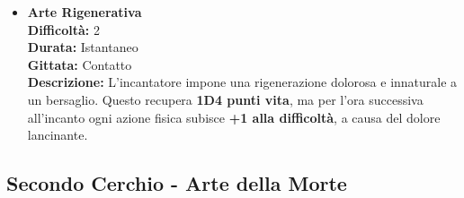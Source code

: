 \documentclass[./magie.tex]{subfiles}
\begin{document}
\begin{itemize}
\vspace{0.5cm}\rule{\textwidth}{0.4pt}\vspace{1cm}

\item \textbf{Arte Rigenerativa} \\
\textbf{Difficoltà:} 2 \\
\textbf{Durata:} Istantaneo \\
\textbf{Gittata:} Contatto \\
\textbf{Descrizione:} L'incantatore impone una rigenerazione dolorosa e innaturale a un bersaglio. Questo recupera \textbf{1D4 punti vita}, ma per l'ora successiva all'incanto ogni azione fisica subisce \textbf{+1 alla difficoltà}, a causa del dolore lancinante.

\end{itemize}

\clearpage
 \subsection*{Secondo Cerchio - Arte della Morte}
\end{document}
